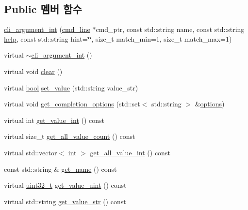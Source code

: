 \subsection*{Public 멤버 함수}
\begin{DoxyCompactItemize}
\item 
\hyperlink{classcli__argument__int_a52b20aecded05e0102246887b4afd6af}{cli\+\_\+argument\+\_\+int} (\hyperlink{classcmd__line}{cmd\+\_\+line} $\ast$cmd\+\_\+ptr, const std\+::string name, const std\+::string \hyperlink{simple__rx_8c_ad8c51bbfda76f19f61c727838e6eee30}{help}, const std\+::string hint=\char`\"{}\char`\"{}, size\+\_\+t match\+\_\+min=1, size\+\_\+t match\+\_\+max=1)
\item 
virtual \hyperlink{classcli__argument__int_aa65363c9d11b341afdff225452d9b418}{$\sim$cli\+\_\+argument\+\_\+int} ()
\item 
virtual void \hyperlink{classcli__argument__int_ac8bb3912a3ce86b15842e79d0b421204}{clear} ()
\item 
virtual \hyperlink{avb__gptp_8h_af6a258d8f3ee5206d682d799316314b1}{bool} \hyperlink{classcli__argument__int_aa768ad337cc685b348672423139875a4}{set\+\_\+value} (std\+::string value\+\_\+str)
\item 
virtual void \hyperlink{classcli__argument__int_a352166cf0e4c52574c7ca484bbcc44ed}{get\+\_\+completion\+\_\+options} (std\+::set$<$ std\+::string $>$ \&\hyperlink{aaf-talker_8c_abc1fd3a47aea6a8944038c9100eb9135}{options})
\item 
virtual int \hyperlink{classcli__argument__int_a70de7682629678e3139c0511910036c1}{get\+\_\+value\+\_\+int} () const 
\item 
virtual size\+\_\+t \hyperlink{classcli__argument__int_ac6f27f29a2c1249e0c49cc9064ee75ad}{get\+\_\+all\+\_\+value\+\_\+count} () const 
\item 
virtual std\+::vector$<$ int $>$ \hyperlink{classcli__argument__int_a714bede99fe9cb950c3c93e81cb96074}{get\+\_\+all\+\_\+value\+\_\+int} () const 
\item 
const std\+::string \& \hyperlink{classcli__argument_a5d21f54a56044f0fd7b2d9bb0474ba33}{get\+\_\+name} () const 
\item 
virtual \hyperlink{parse_8c_a6eb1e68cc391dd753bc8ce896dbb8315}{uint32\+\_\+t} \hyperlink{classcli__argument_a5f9326ccc460c0477c9ec2a3c6fe8e2b}{get\+\_\+value\+\_\+uint} () const 
\item 
virtual std\+::string \hyperlink{classcli__argument_a30924e54bc1df74cadc22e90d43c0124}{get\+\_\+value\+\_\+str} () const 
\item 

\end{DoxyCompactItemize}

